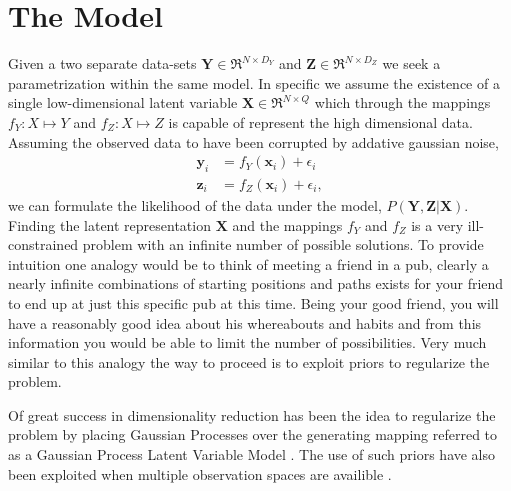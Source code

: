 \section{The Model}
Given a two separate data-sets $\mathbf{Y}\in\Re^{N\times D_Y}$ and
$\mathbf{Z}\in\Re^{N\times D_Z}$ we seek a parametrization within the
same model. In specific we assume the existence of a single
low-dimensional latent variable $\mathbf{X}\in\Re^{N\times Q}$ which
through the mappings $f_Y: X \mapsto Y$ and $f_Z: X \mapsto Z$ is
capable of represent the high dimensional data. Assuming the observed
data to have been corrupted by addative gaussian noise,
\begin{align}
  \mathbf{y}_i &= f_Y(\mathbf{x}_i) + \epsilon_i\nonumber\\
  \mathbf{z}_i &= f_Z(\mathbf{x}_i) + \epsilon_i,
\end{align}
we can formulate the likelihood of the data under the model,
$P(\mathbf{Y},\mathbf{Z}|\mathbf{X})$. Finding the latent
representation $\mathbf{X}$ and the mappings $f_Y$ and $f_Z$ is a very
ill-constrained problem with an infinite number of possible
solutions. To provide intuition one analogy would be to think of
meeting a friend in a pub, clearly a nearly infinite combinations of
starting positions and paths exists for your friend to end up at just
this specific pub at this time. Being your good friend, you will have
a reasonably good idea about his whereabouts and habits and from this
information you would be able to limit the number of
possibilities. Very much similar to this analogy the way to proceed is
to exploit priors to regularize the problem.

Of great success in dimensionality reduction has been the idea to
regularize the problem by placing Gaussian Processes
\cite{Rasmussen:2005te} over the generating mapping referred to as a
Gaussian Process Latent Variable Model \cite{Lawrence:2005vk}. The use
of such priors have also been exploited when multiple observation
spaces are availible \cite{Shon:2006wr,Ek:2007uo}. 



